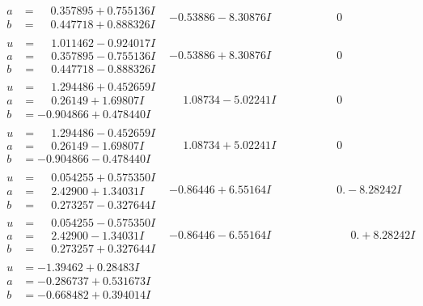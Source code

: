 \documentclass[1p]{elsarticle_modified}
\theoremstyle{definition}
\begin{document}
$$\begin{array}{c|c|c}
\begin{aligned}
a &= \phantom{-}0.357895 + 0.755136 I \\
b &= \phantom{-}0.447718 + 0.888326 I\end{aligned}
 & -0.53886 - 8.30876 I & \phantom{-0.000000 } 0 \\ \hline\begin{aligned}
u &= \phantom{-}1.011462 - 0.924017 I \\
a &= \phantom{-}0.357895 - 0.755136 I \\
b &= \phantom{-}0.447718 - 0.888326 I\end{aligned}
 & -0.53886 + 8.30876 I & \phantom{-0.000000 } 0 \\ \hline\begin{aligned}
u &= \phantom{-}1.294486 + 0.452659 I \\
a &= \phantom{-}0.26149 + 1.69807 I \\
b &= -0.904866 + 0.478440 I\end{aligned}
 & \phantom{-}1.08734 - 5.02241 I & \phantom{-0.000000 } 0 \\ \hline\begin{aligned}
u &= \phantom{-}1.294486 - 0.452659 I \\
a &= \phantom{-}0.26149 - 1.69807 I \\
b &= -0.904866 - 0.478440 I\end{aligned}
 & \phantom{-}1.08734 + 5.02241 I & \phantom{-0.000000 } 0 \\ \hline\begin{aligned}
u &= \phantom{-}0.054255 + 0.575350 I \\
a &= \phantom{-}2.42900 + 1.34031 I \\
b &= \phantom{-}0.273257 - 0.327644 I\end{aligned}
 & -0.86446 + 6.55164 I & \phantom{-0.000000 } 0. - 8.28242 I \\ \hline\begin{aligned}
u &= \phantom{-}0.054255 - 0.575350 I \\
a &= \phantom{-}2.42900 - 1.34031 I \\
b &= \phantom{-}0.273257 + 0.327644 I\end{aligned}
 & -0.86446 - 6.55164 I & \phantom{-0.000000 -}0. + 8.28242 I \\ \hline\begin{aligned}
u &= -1.39462 + 0.28483 I \\
a &= -0.286737 + 0.531673 I \\
b &= -0.668482 + 0.394014 I\end{aligned}

\end{array}$$
\end{document}

